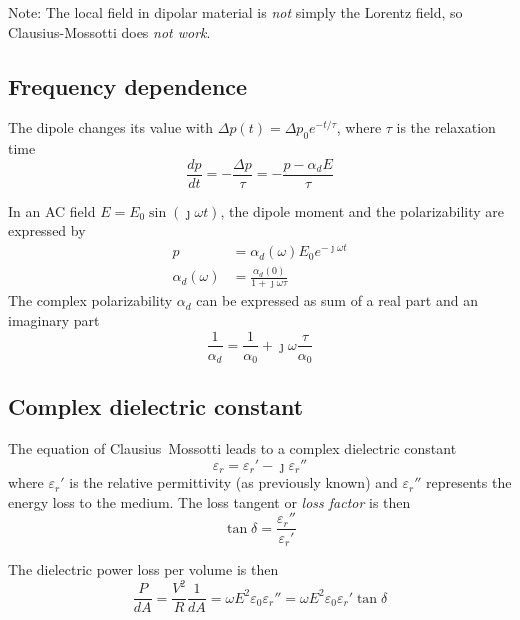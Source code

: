 Note: The local field in dipolar material is \emph{not} simply the Lorentz field,
so Clausius-Mossotti does \emph{not work}. 

\subsection{Frequency dependence}
The dipole changes its value with $\Delta p(t) = \Delta p_0 e^{-t/\tau}$,
where $\tau$ is the relaxation time
\begin{equation}
    \frac{dp}{dt} = -\frac{\Delta p}{\tau} = -\frac{p - \alpha_d E}{\tau}
\end{equation}

In an AC field $E = E_0 \sin(\jmath \omega t)$, the dipole moment and the
polarizability are expressed by
\begin{align}
    p &= \alpha_d(\omega) E_0 e^{-\jmath\omega t} \\
    \alpha_d(\omega) &= \frac{\alpha_d(0)}{1 + \jmath \omega \tau}
\end{align}
The complex polarizability $\alpha_d$ can be expressed as sum of a real part and
an imaginary part
\begin{equation}
    \frac{1}{\alpha_d} = \frac{1}{\alpha_0} + \jmath\omega\frac{\tau}{\alpha_0}
\end{equation}

\subsection{Complex dielectric constant}
The equation of Clausius~Mossotti leads to a complex dielectric constant
\begin{equation}
    \varepsilon_r = \varepsilon_r' - \jmath\varepsilon_r''
\end{equation}
where $\varepsilon_r'$ is the relative permittivity (as previously known)
and $\varepsilon_r''$ represents the energy loss to the medium.
The loss tangent or \emph{loss factor} is then
\begin{equation}
    \tan\delta=\frac{\varepsilon_r''}{\varepsilon_r'}
\end{equation}

The dielectric power loss per volume is then
\begin{equation}
    \frac{P}{dA} = \frac{V^2}{R}\frac{1}{dA} = \omega E^2 \varepsilon_0\varepsilon_r'' = \omega E^2 \varepsilon_0 \varepsilon_r' \tan\delta
\end{equation}

